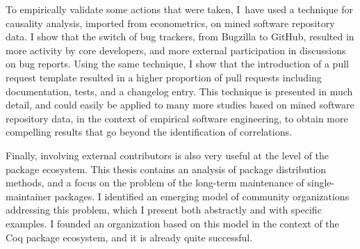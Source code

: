 To empirically validate some actions that were taken, I have used a technique for causality analysis, imported from econometrics, on mined software repository data.
I show that the switch of bug trackers, from Bugzilla to GitHub, resulted in more activity by core developers, and more external participation in discussions on bug reports.
Using the same technique, I show that the introduction of a pull request template resulted in a higher proportion of pull requests including documentation, tests, and a changelog entry.
This technique is presented in much detail, and could easily be applied to many more studies based on mined software repository data, in the context of empirical software engineering, to obtain more compelling results that go beyond the identification of correlations.

Finally, involving external contributors is also very useful at the level of the package ecosystem.
This thesis contains an analysis of package distribution methods, and a focus on the problem of the long-term maintenance of single-maintainer packages.
I identified an emerging model of community organizations addressing this problem, which I present both abstractly and with specific examples.
I founded an organization based on this model in the context of the Coq package ecosystem, and it is already quite successful.
